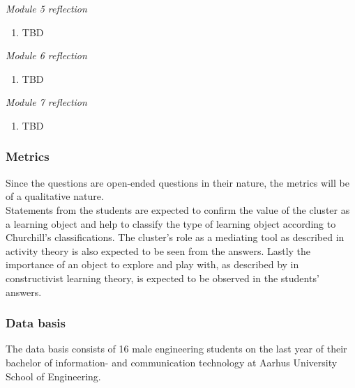 \noindent
\textit{Module 5 reflection}
\begin{enumerate}
\setlength\itemsep{0.05em}
	\item TBD
\end{enumerate}

\noindent
\textit{Module 6 reflection}
\begin{enumerate}
\setlength\itemsep{0.05em}
	\item TBD
\end{enumerate}

\noindent
\textit{Module 7 reflection}
\begin{enumerate}
\setlength\itemsep{0.05em}
	\item TBD
\end{enumerate}

\subsubsection*{Metrics}
Since the questions are open-ended questions in their nature, the metrics will be of a qualitative nature.
\\
Statements from the students are expected to confirm the value of the cluster as a learning object and help to classify the type of learning object according to Churchill's classifications. The cluster's role as a mediating tool as described in activity theory is also expected to be seen from the answers. Lastly the importance of an object to explore and play with, as described by in constructivist learning theory, is expected to be observed in the students' answers.

\subsubsection*{Data basis}
The data basis consists of 16 male engineering students on the last year of their bachelor of information- and communication technology at Aarhus University School of Engineering.

